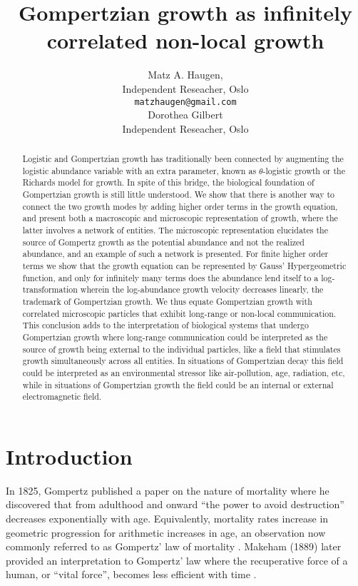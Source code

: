 \documentclass{article}
\title{Gompertzian growth as infinitely correlated non-local growth}
\author{Matz A. Haugen, \\
Independent Reseacher, Oslo\\
\texttt{matzhaugen@gmail.com} \\
  \And
  Dorothea Gilbert \\
  Independent Reseacher, Oslo\\
}
\begin{document}
\maketitle

\begin{abstract}
Logistic and Gompertzian growth has traditionally been connected by augmenting the logistic abundance variable with an extra parameter, known as $\theta$-logistic growth or the Richards model for growth. In spite of this bridge, the biological foundation of Gompertzian growth is still little understood. We show that there is another way to connect the two growth modes by adding higher order terms in the growth equation, and present both a macroscopic and microscopic representation of growth, where the latter involves a network of entities. The microscopic representation elucidates the source of Gompertz growth as the potential abundance and not the realized abundance, and an example of such a network is presented. For finite higher order terms we show that the growth equation can be represented by Gauss' Hypergeometric function, and only for infinitely many terms does the abundance lend itself to a log-transformation wherein the log-abundance growth velocity decreases linearly, the trademark of Gompertzian growth. We thus equate Gompertzian growth with correlated microscopic particles that exhibit long-range or non-local communication. This conclusion adds to the interpretation of biological systems that undergo Gompertzian growth where long-range communication could be interpreted as the source of growth being external to the individual particles, like a field that stimulates growth simultaneously across all entities. In situations of Gompertzian decay this field could be interpreted as an environmental stressor like air-pollution, age, radiation, etc, while in situations of Gompertzian growth the field could be an internal or external electromagnetic field.
\end{abstract}


\section{Introduction}

In 1825, Gompertz published a paper on the nature of mortality where he discovered that from adulthood and onward ``the power to avoid destruction'' decreases exponentially with age. Equivalently, mortality rates increase in geometric progression for arithmetic increases in age, an observation now commonly referred to as Gompertz' law of mortality \cite{Gompertz1825}. Makeham (1889) later provided an interpretation to Gompertz' law where the recuperative force of a human, or ``vital force'', becomes less efficient with time \cite{makeham1889further}. 
\end{document}
